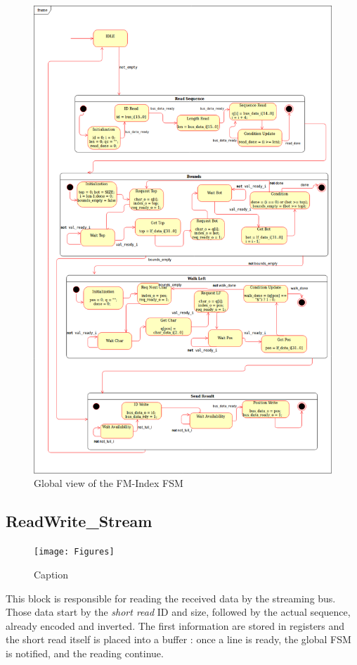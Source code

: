 \begin{figure}[H]
 \includegraphics[scale = 0.4]{Figures/MSS.png}
    \caption{Global view of the FM-Index FSM}
    \label{fig:fsm}
\end{figure}

\subsection{ReadWrite\_Stream}

\begin{figure}[H]
    \centering
    \texttt{[image: Figures]}
    \caption{Caption}
    \label{fig:my_label}
\end{figure}
This block is responsible for reading the received data by the streaming bus. Those data start by the \textsl{short read} ID and size, followed by the actual sequence, already encoded and inverted. The first information are stored in registers and the short read itself is placed into a buffer : once a line is ready, the global FSM is notified, and the reading continue.

